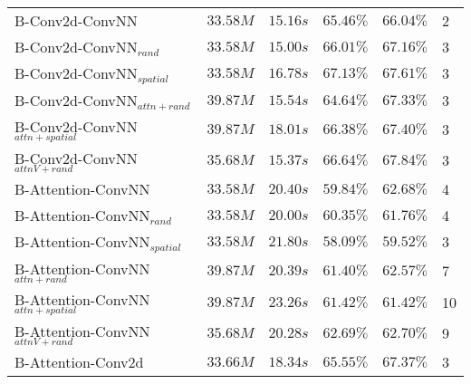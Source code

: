 \documentclass{article}
\begin{document}
\begin{table}[h]
\begin{threeparttable}
\begin{tabular}{@{}l|l|l|l|l|l@{}}
      \midrule
      B-Conv2d-ConvNN                       & \(33.58M\) & \(15.16s\) & \(\bm{65.46\%}\) & \(\bm{66.04\%}\) & 2 \\
      B-Conv2d-ConvNN\(_{rand}\)            & \(33.58M\) & \(15.00s\) & \(\bm{66.01\%}\) & \(\bm{67.16\%}\) & 3 \\
      B-Conv2d-ConvNN\(_{spatial}\)         & \(33.58M\) & \(16.78s\) & \(\bm{67.13\%}\) & \(\bm{67.61\%}\) & 3 \\
      
      \midrule
      B-Conv2d-ConvNN\(_{attn+rand}\)       & \(39.87M\) & \(15.54s\) & \(\bm{64.64\%}\) & \(\bm{67.33\%}\) & 3 \\
      B-Conv2d-ConvNN\(_{attn+spatial}\)    & \(39.87M\) & \(18.01s\) & \(\bm{66.38\%}\) & \(\bm{67.40\%}\) & 3 \\
      B-Conv2d-ConvNN\(_{attnV+rand}\)      & \(35.68M\) & \(15.37s\) & \(\bm{66.64\%}\) & \(\bm{67.84\%}\) & 3 \\
      
      \midrule
      B-Attention-ConvNN                     & \(33.58M\) & \(20.40s\) & \(59.84\%\) & \(62.68\%\) & 4 \\
      B-Attention-ConvNN\(_{rand}\)          & \(33.58M\) & \(20.00s\) & \(60.35\%\) & \(61.76\%\) & 4 \\
      B-Attention-ConvNN\(_{spatial}\)       & \(33.58M\) & \(21.80s\) & \(58.09\%\) & \(59.52\%\) & 3 \\
      
      \midrule
      B-Attention-ConvNN\(_{attn+rand}\)     & \(39.87M\) & \(20.39s\) & \(61.40\%\) & \(62.57\%\) & 7 \\
      B-Attention-ConvNN\(_{attn+spatial}\)  & \(39.87M\) & \(23.26s\) & \(61.42\%\) & \(61.42\%\) & 10 \\
      B-Attention-ConvNN\(_{attnV+rand}\)    & \(35.68M\) & \(20.28s\) & \(62.69\%\) & \(62.70\%\) & 9 \\
      
      \midrule
       B-Attention-Conv2d                    & \(33.66M\) & \(18.34s\) & \(\bm{65.55\%}\) & \(\bm{67.37\%}\) & 3 \\
      

\end{tabular}
\end{threeparttable}
\end{table}
\end{document}
